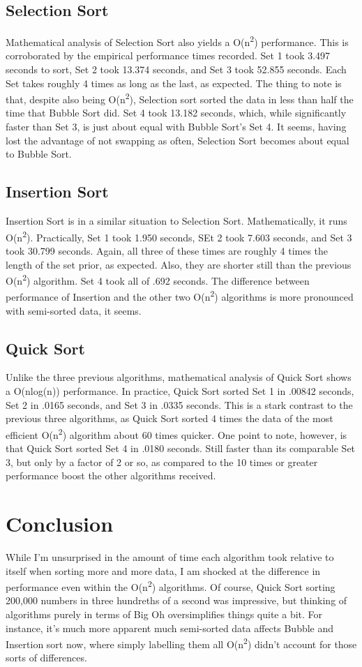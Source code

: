 \documentclass[conference]{IEEEtran}
\begin{document}
\subsection{Selection Sort}
Mathematical analysis of Selection Sort also yields a O(n\textsuperscript{2}) performance.
This is corroborated by the empirical performance times recorded.
Set 1 took 3.497 seconds to sort, Set 2 took 13.374 seconds, and Set 3 took 52.855 seconds.
Each Set takes roughly 4 times as long as the last, as expected.
The thing to note is that, despite also being O(n\textsuperscript{2}), Selection sort sorted the data in less than half the time that Bubble Sort did.
Set 4 took 13.182 seconds, which, while significantly faster than Set 3, is just about equal with Bubble Sort's Set 4.
It seems, having lost the advantage of not swapping as often, Selection Sort becomes about equal to Bubble Sort.

\subsection{Insertion Sort}
Insertion Sort is in a similar situation to Selection Sort.
Mathematically, it runs O(n\textsuperscript{2}).
Practically, Set 1 took 1.950 seconds, SEt 2 took 7.603 seconds, and Set 3 took 30.799 seconds.
Again, all three of these times are roughly 4 times the length of the set prior, as expected.
Also, they are shorter still than the previous O(n\textsuperscript{2}) algorithm.
Set 4 took all of .692 seconds.
The difference between performance of Insertion and the other two O(n\textsuperscript{2}) algorithms is more pronounced with semi-sorted data, it seems.

\subsection{Quick Sort}
Unlike the three previous algorithms, mathematical analysis of Quick Sort shows a O(nlog(n)) performance.
In practice, Quick Sort sorted Set 1 in .00842 seconds, Set 2 in .0165 seconds, and Set 3 in .0335 seconds.
This is a stark contrast to the previous three algorithms, as Quick Sort sorted 4 times the data of the most efficient O(n\textsuperscript{2}) algorithm about 60 times quicker.
One point to note, however, is that Quick Sort sorted Set 4 in .0180 seconds.
Still faster than its comparable Set 3, but only by a factor of 2 or so, as compared to the 10 times or greater performance boost the other algorithms received.

\section{Conclusion}
While I'm unsurprised in the amount of time each algorithm took relative to itself when sorting more and more data, I am shocked at the difference in performance even within the O(n\textsuperscript{2}) algorithms.
Of course, Quick Sort sorting 200,000 numbers in three hundreths of a second was impressive, but thinking of algorithms purely in terms of Big Oh oversimplifies things quite a bit.
For instance, it's much more apparent much semi-sorted data affects Bubble and Insertion sort now, where simply labelling them all O(n\textsuperscript{2}) didn't account for those sorts of differences.
\end{document}
